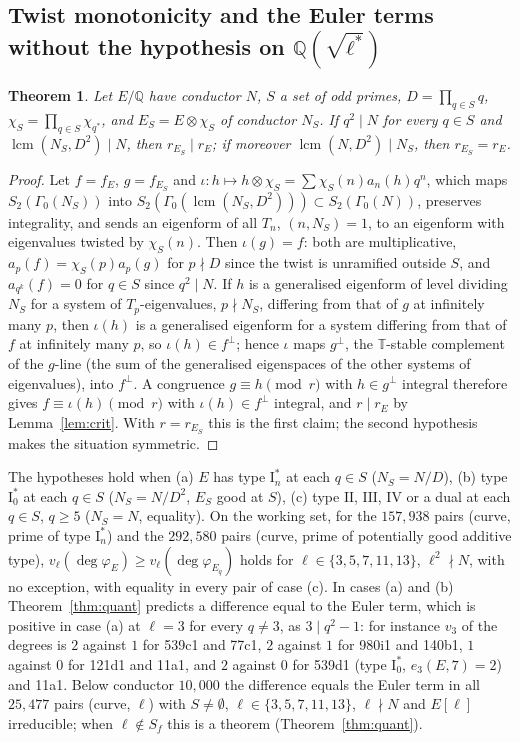 \documentclass[11pt]{amsart}
\newtheorem{theorem}{Theorem}[section]
\theoremstyle{definition}
\newcommand{\Q}{\mathbb{Q}}
\newcommand{\T}{\mathbb{T}}
\newcommand{\degphi}{\deg\varphi_E}
\begin{document}
\subsection{Twist monotonicity and the Euler terms without the hypothesis on \texorpdfstring{$\Q(\sqrt{\ell^*})$}{Q(sqrt l*)}}\label{sec:twisting}
\begin{theorem}\label{thm:twist}
Let $E/\Q$ have conductor $N$, $S$ a set of odd primes, $D=\prod_{q\in S}q$, $\chi_S=\prod_{q\in S}\chi_{q^*}$, and $E_S=E\otimes\chi_S$ of conductor $N_S$. If $q^2\mid N$ for every $q\in S$ and $\operatorname{lcm}(N_S,D^2)\mid N$, then $r_{E_S}\mid r_E$; if moreover $\operatorname{lcm}(N,D^2)\mid N_S$, then $r_{E_S}=r_E$.
\end{theorem}
\begin{proof}
Let $f=f_E$, $g=f_{E_S}$ and $\iota\colon h\mapsto h\otimes\chi_S=\sum\chi_S(n)a_n(h)q^n$, which maps $S_2(\Gamma_0(N_S))$ into $S_2(\Gamma_0(\operatorname{lcm}(N_S,D^2)))\subset S_2(\Gamma_0(N))$, preserves integrality, and sends an eigenform of all $T_n$, $(n,N_S)=1$, to an eigenform with eigenvalues twisted by $\chi_S(n)$. Then $\iota(g)=f$: both are multiplicative, $a_p(f)=\chi_S(p)a_p(g)$ for $p\nmid D$ since the twist is unramified outside $S$, and $a_{q^k}(f)=0$ for $q\in S$ since $q^2\mid N$. If $h$ is a generalised eigenform of level dividing $N_S$ for a system of $T_p$-eigenvalues, $p\nmid N_S$, differing from that of $g$ at infinitely many $p$, then $\iota(h)$ is a generalised eigenform for a system differing from that of $f$ at infinitely many $p$, so $\iota(h)\in f^\perp$; hence $\iota$ maps $g^\perp$, the $\T$-stable complement of the $g$-line (the sum of the generalised eigenspaces of the other systems of eigenvalues), into $f^\perp$. A congruence $g\equiv h\pmod r$ with $h\in g^\perp$ integral therefore gives $f\equiv\iota(h)\pmod r$ with $\iota(h)\in f^\perp$ integral, and $r\mid r_E$ by Lemma~\ref{lem:crit}. With $r=r_{E_S}$ this is the first claim; the second hypothesis makes the situation symmetric.
\end{proof}
The hypotheses hold when (a) $E$ has type $\mathrm{I}_n^*$ at each $q\in S$ ($N_S=N/D$), (b) type $\mathrm{I}_0^*$ at each $q\in S$ ($N_S=N/D^2$, $E_S$ good at $S$), (c) type $\mathrm{II}$, $\mathrm{III}$, $\mathrm{IV}$ or a dual at each $q\in S$, $q\ge5$ ($N_S=N$, equality). On the working set, for the $157{,}938$ pairs (curve, prime of type $\mathrm{I}_n^*$) and the $292{,}580$ pairs (curve, prime of potentially good additive type), $v_\ell(\degphi)\ge v_\ell(\deg\varphi_{E_q})$ holds for $\ell\in\{3,5,7,11,13\}$, $\ell^2\nmid N$, with no exception, with equality in every pair of case (c). In cases (a) and (b) Theorem~\ref{thm:quant} predicts a difference equal to the Euler term, which is positive in case (a) at $\ell=3$ for every $q\ne3$, as $3\mid q^2-1$: for instance $v_3$ of the degrees is $2$ against $1$ for 539c1 and 77c1, $2$ against $1$ for 980i1 and 140b1, $1$ against $0$ for 121d1 and 11a1, and $2$ against $0$ for 539d1 (type $\mathrm{I}_0^*$, $e_3(E,7)=2$) and 11a1. Below conductor $10{,}000$ the difference equals the Euler term in all $25{,}477$ pairs (curve, $\ell$) with $S\ne\emptyset$, $\ell\in\{3,5,7,11,13\}$, $\ell\nmid N$ and $E[\ell]$ irreducible; when $\ell\notin S_f$ this is a theorem (Theorem~\ref{thm:quant}).
\end{document}
